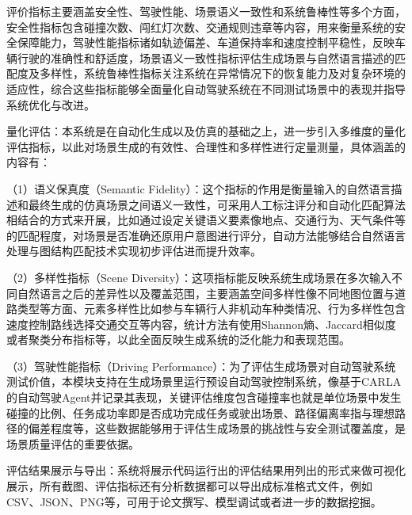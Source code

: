 评价指标主要涵盖安全性、驾驶性能、场景语义一致性和系统鲁棒性等多个方面，安全性指标包含碰撞次数、闯红灯次数、交通规则违章等内容，用来衡量系统的安全保障能力，驾驶性能指标诸如轨迹偏差、车道保持率和速度控制平稳性，反映车辆行驶的准确性和舒适度，场景语义一致性指标评估生成场景与自然语言描述的匹配度及多样性，系统鲁棒性指标关注系统在异常情况下的恢复能力及对复杂环境的适应性，综合这些指标能够全面量化自动驾驶系统在不同测试场景中的表现并指导系统优化与改进。

量化评估：本系统是在自动化生成以及仿真的基础之上，进一步引入多维度的量化评估指标，以此对场景生成的有效性、合理性和多样性进行定量测量，具体涵盖的内容有：

（1）语义保真度（Semantic Fidelity）：这个指标的作用是衡量输入的自然语言描述和最终生成的仿真场景之间语义一致性，可采用人工标注评分和自动化匹配算法相结合的方式来开展，比如通过设定关键语义要素像地点、交通行为、天气条件等的匹配程度，对场景是否准确还原用户意图进行评分，自动方法能够结合自然语言处理与图结构匹配技术实现初步评估进而提升效率。


（2）多样性指标（Scene Diversity）：这项指标能反映系统生成场景在多次输入不同自然语言之后的差异性以及覆盖范围，主要涵盖空间多样性像不同地图位置与道路类型等方面、元素多样性比如参与车辆行人非机动车种类情况、行为多样性包含速度控制路线选择交通交互等内容，统计方法有使用Shannon熵、Jaccard相似度或者聚类分布指标等，以此全面反映生成系统的泛化能力和表现范围。

（3）驾驶性能指标（Driving Performance）：为了评估生成场景对自动驾驶系统测试价值，本模块支持在生成场景里运行预设自动驾驶控制系统，像基于CARLA的自动驾驶Agent并记录其表现，关键评估维度包含碰撞率也就是单位场景中发生碰撞的比例、任务成功率即是否成功完成任务或驶出场景、路径偏离率指与理想路径的偏差程度等，这些数据能够用于评估生成场景的挑战性与安全测试覆盖度，是场景质量评估的重要依据。

评估结果展示与导出：系统将展示代码运行出的评估结果用列出的形式来做可视化展示，所有截图、评估指标还有分析数据都可以导出成标准格式文件，例如CSV、JSON、PNG等，可用于论文撰写、模型调试或者进一步的数据挖掘。

